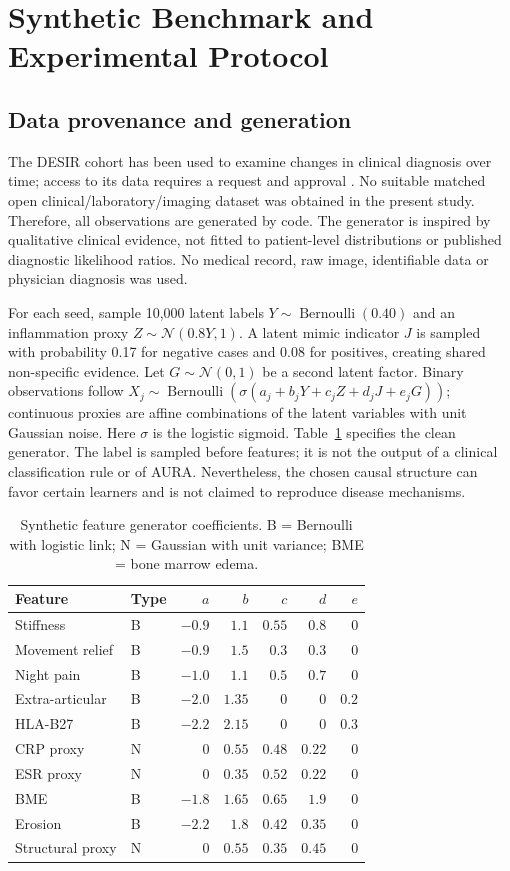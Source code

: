 \documentclass[conference]{IEEEtran}
\begin{document}
\section{Synthetic Benchmark and Experimental Protocol}
\subsection{Data provenance and generation}
The DESIR cohort has been used to examine changes in clinical diagnosis over time; access to its data requires a request and approval \cite{desir}. No suitable matched open clinical/laboratory/imaging dataset was obtained in the present study. Therefore, all observations are generated by code. The generator is inspired by qualitative clinical evidence, not fitted to patient-level distributions or published diagnostic likelihood ratios. No medical record, raw image, identifiable data or physician diagnosis was used.

For each seed, sample 10,000 latent labels $Y\sim\operatorname{Bernoulli}(0.40)$ and an inflammation proxy $Z\sim\mathcal N(0.8Y,1)$. A latent mimic indicator $J$ is sampled with probability 0.17 for negative cases and 0.08 for positives, creating shared non-specific evidence. Let $G\sim\mathcal N(0,1)$ be a second latent factor. Binary observations follow $X_j\sim\operatorname{Bernoulli}(\sigma(a_j+b_jY+c_jZ+d_jJ+e_jG))$; continuous proxies are affine combinations of the latent variables with unit Gaussian noise. Here $\sigma$ is the logistic sigmoid. Table~\ref{tab:coeff} specifies the clean generator. The label is sampled before features; it is not the output of a clinical classification rule or of AURA. Nevertheless, the chosen causal structure can favor certain learners and is not claimed to reproduce disease mechanisms.
\begin{table}[t]
\caption{Synthetic feature generator coefficients. B = Bernoulli with logistic link; N = Gaussian with unit variance; BME = bone marrow edema.}
\label{tab:coeff}
\centering\footnotesize
\begin{tabular}{@{}llrrrrr@{}}\toprule
Feature & Type & $a$ & $b$ & $c$ & $d$ & $e$\\\midrule
Stiffness & B & $-0.9$ & $1.1$ & $0.55$ & $0.8$ & $0$\\
Movement relief & B & $-0.9$ & $1.5$ & $0.3$ & $0.3$ & $0$\\
Night pain & B & $-1.0$ & $1.1$ & $0.5$ & $0.7$ & $0$\\
Extra-articular & B & $-2.0$ & $1.35$ & $0$ & $0$ & $0.2$\\
HLA-B27 & B & $-2.2$ & $2.15$ & $0$ & $0$ & $0.3$\\
CRP proxy & N & $0$ & $0.55$ & $0.48$ & $0.22$ & $0$\\
ESR proxy & N & $0$ & $0.35$ & $0.52$ & $0.22$ & $0$\\
BME & B & $-1.8$ & $1.65$ & $0.65$ & $1.9$ & $0$\\
Erosion & B & $-2.2$ & $1.8$ & $0.42$ & $0.35$ & $0$\\
Structural proxy & N & $0$ & $0.55$ & $0.35$ & $0.45$ & $0$\\\bottomrule
\end{tabular}
\end{table}
\end{document}
